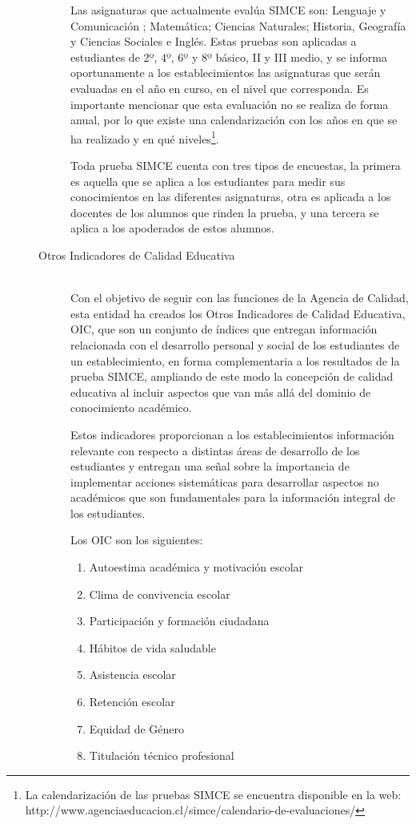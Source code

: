 \begin{description}
\begin{description}
    Las asignaturas que actualmente evalúa SIMCE son: Lenguaje y Comunicación ; Matemática; Ciencias Naturales; Historia, Geografía y Ciencias Sociales e Inglés. Estas pruebas son aplicadas a estudiantes de 2º, 4º, 6º y 8º básico, II  y III medio, y se informa oportunamente a los establecimientos las asignaturas que serán evaluadas en el año en curso, en el nivel que corresponda. Es importante mencionar que esta evaluación no se realiza de forma anual, por lo que existe una calendarización con los años en que se ha realizado y en qué niveles\footnote{La calendarización de las pruebas SIMCE se encuentra disponible en la web: http://www.agenciaeducacion.cl/simce/calendario-de-evaluaciones/}.
    
    Toda prueba SIMCE cuenta con tres tipos de encuestas, la primera es aquella que se aplica a los estudiantes para medir sus conocimientos en las diferentes asignaturas, otra es aplicada a los docentes de los alumnos que rinden la prueba, y una tercera se aplica a los apoderados de estos alumnos.
    
    \item[Otros Indicadores de Calidad Educativa] \hfill \\
    Con el objetivo de seguir con las funciones de la Agencia de Calidad, esta entidad ha creados los Otros Indicadores de Calidad Educativa, OIC, que son un conjunto de índices que entregan información relacionada con el desarrollo personal y social de los estudiantes de un establecimiento, en forma complementaria a los resultados de la prueba SIMCE, ampliando de este modo la concepción de calidad educativa al incluir aspectos que van más allá del dominio de conocimiento académico.
    
    Estos indicadores proporcionan a los establecimientos información relevante con respecto a distintas áreas de desarrollo de los estudiantes y entregan una señal sobre la importancia de implementar acciones sistemáticas para desarrollar aspectos no académicos que son fundamentales para la información integral de los estudiantes.
    
    Los OIC son los siguientes:
    \begin{enumerate}
    \item Autoestima académica y motivación escolar
    \item Clima de convivencia escolar
    \item Participación y formación ciudadana
    \item Hábitos de vida saludable
    \item Asistencia escolar
    \item Retención escolar
    \item Equidad de Género
    \item Titulación técnico profesional
     \end{enumerate}
     

\end{description}
\end{description}
